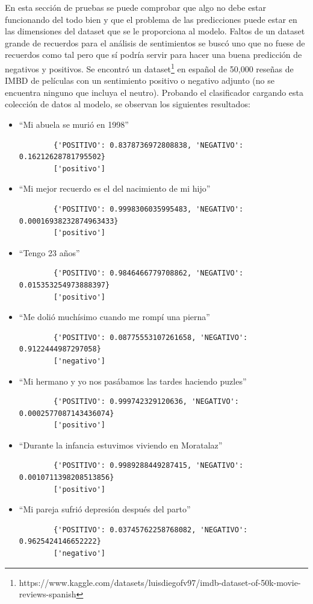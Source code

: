 En esta sección de pruebas se puede comprobar que algo no debe estar funcionando del todo bien y que el problema de las predicciones puede estar en las dimensiones del dataset que se le proporciona al modelo. Faltos de un dataset grande de recuerdos para el análisis de sentimientos se buscó uno que no fuese de recuerdos como tal pero que sí podría servir para hacer una buena predicción de negativos y positivos. Se encontró un dataset\footnote{https://www.kaggle.com/datasets/luisdiegofv97/imdb-dataset-of-50k-movie-reviews-spanish} en español de 50,000 reseñas de IMBD de películas con un sentimiento positivo o negativo adjunto (no se encuentra ninguno que incluya el neutro). Probando el clasificador cargando esta colección de datos al modelo, se observan los siguientes resultados: 

\begin{itemize}
	\item ``Mi abuela se murió en 1998''
	\begin{verbatim}
		{'POSITIVO': 0.8378736972808838, 'NEGATIVO': 0.16212628781795502}
		['positivo']
	\end{verbatim}
	\item ``Mi mejor recuerdo es el del nacimiento de mi hijo''
	\begin{verbatim}
		{'POSITIVO': 0.9998306035995483, 'NEGATIVO': 0.00016938232874963433}
		['positivo']
	\end{verbatim}
	\item ``Tengo 23 años''
	\begin{verbatim}
		{'POSITIVO': 0.9846466779708862, 'NEGATIVO': 0.015353254973888397}
		['positivo']
	\end{verbatim}
	\item ``Me dolió muchísimo cuando me rompí una pierna''
	\begin{verbatim}
		{'POSITIVO': 0.08775553107261658, 'NEGATIVO': 0.9122444987297058}
		['negativo']
	\end{verbatim}
	\item ``Mi hermano y yo nos pasábamos las tardes haciendo puzles''
	\begin{verbatim}
		{'POSITIVO': 0.999742329120636, 'NEGATIVO': 0.0002577087143436074}
		['positivo']
	\end{verbatim}
	\item ``Durante la infancia estuvimos viviendo en Moratalaz''
	\begin{verbatim}
		{'POSITIVO': 0.9989288449287415, 'NEGATIVO': 0.0010711398208513856}
		['positivo']
	\end{verbatim}
	\item ``Mi pareja sufrió depresión después del parto''
	\begin{verbatim}
		{'POSITIVO': 0.03745762258768082, 'NEGATIVO': 0.9625424146652222}
		['negativo']
	\end{verbatim}
	
\end{itemize}

